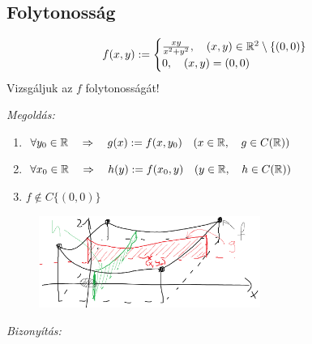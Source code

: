 \documentclass[a4paper,11.5pt]{article}
\begin{document}
	\subsection{Folytonosság}
	\begin{example}
		\[ f(x,y):=\begin{cases}
			\frac{xy}{x^2+y^2},\quad (x,y)\in\mathbb{R}^2\setminus\{ (0,0) \}\\
			0,\quad (x,y)=(0,0)
		\end{cases} \]
		Vizsgáljuk az $f$ folytonosságát!
		
		\textit{Megoldás:}
		\begin{enumerate}
			\item $\forall y_0\in\mathbb{R}\quad \Rightarrow\quad g(x):=f(x,y_0) \quad (x\in\mathbb{R},\quad g\in C(\mathbb{R}))$
			\item $\forall x_0\in\mathbb{R}\quad \Rightarrow\quad h(y):=f(x_0,y)\quad (y\in\mathbb{R},\quad  h\in C(\mathbb{R}))$
			\item $f\notin C\{(0,0)\}$
		\end{enumerate}
		\begin{figure}[H]
			\centering
			\includegraphics[height=3cm]{../2zh/kepek/25.png}
			\caption{}
		\end{figure}
		\textit{Bizonyítás:}
		

\end{example}
\end{document}
